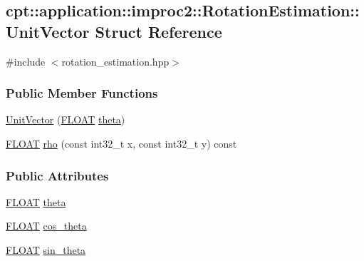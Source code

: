 \hypertarget{structcpt_1_1application_1_1improc2_1_1_rotation_estimation_1_1_unit_vector}{\subsection{cpt\-:\-:application\-:\-:improc2\-:\-:Rotation\-Estimation\-:\-:Unit\-Vector Struct Reference}
\label{structcpt_1_1application_1_1improc2_1_1_rotation_estimation_1_1_unit_vector}
}


{\ttfamily \#include $<$rotation\-\_\-estimation.\-hpp$>$}

\subsubsection*{Public Member Functions}
\begin{DoxyCompactItemize}
\item 
\hyperlink{structcpt_1_1application_1_1improc2_1_1_rotation_estimation_1_1_unit_vector_aae9ea074949e79d487d4cea8d79b41ff}{Unit\-Vector} (\hyperlink{classcpt_1_1application_1_1improc2_1_1_rotation_estimation_a7169f80f99e5e3ef37a3e8d4a69d9b11}{F\-L\-O\-A\-T} \hyperlink{structcpt_1_1application_1_1improc2_1_1_rotation_estimation_1_1_unit_vector_a993f1065d2f06d950152dbcc44bf8d32}{theta})
\item 
\hyperlink{classcpt_1_1application_1_1improc2_1_1_rotation_estimation_a7169f80f99e5e3ef37a3e8d4a69d9b11}{F\-L\-O\-A\-T} \hyperlink{structcpt_1_1application_1_1improc2_1_1_rotation_estimation_1_1_unit_vector_a7f931fba84084bda865ee0569d87d1d0}{rho} (const int32\-\_\-t x, const int32\-\_\-t y) const 
\end{DoxyCompactItemize}
\subsubsection*{Public Attributes}
\begin{DoxyCompactItemize}
\item 
\hyperlink{classcpt_1_1application_1_1improc2_1_1_rotation_estimation_a7169f80f99e5e3ef37a3e8d4a69d9b11}{F\-L\-O\-A\-T} \hyperlink{structcpt_1_1application_1_1improc2_1_1_rotation_estimation_1_1_unit_vector_a993f1065d2f06d950152dbcc44bf8d32}{theta}
\item 
\hyperlink{classcpt_1_1application_1_1improc2_1_1_rotation_estimation_a7169f80f99e5e3ef37a3e8d4a69d9b11}{F\-L\-O\-A\-T} \hyperlink{structcpt_1_1application_1_1improc2_1_1_rotation_estimation_1_1_unit_vector_aa1702544672a9bed6a03a35f31f1a9e2}{cos\-\_\-theta}
\item 
\hyperlink{classcpt_1_1application_1_1improc2_1_1_rotation_estimation_a7169f80f99e5e3ef37a3e8d4a69d9b11}{F\-L\-O\-A\-T} \hyperlink{structcpt_1_1application_1_1improc2_1_1_rotation_estimation_1_1_unit_vector_a89719a1e2643e05276c490cb1f43b733}{sin\-\_\-theta}
\end{DoxyCompactItemize}



